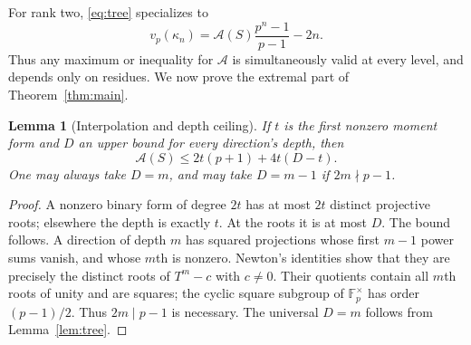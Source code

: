 \documentclass[11pt]{article}
\newtheorem{lemma}[theorem]{Lemma}
\theoremstyle{remark}\newtheorem{remark}[theorem]{Remark}
\newcommand{\F}{\mathbb F}
\newcommand{\A}{\mathcal A}
\newcommand{\vp}{v_p}
\begin{document}
For rank two, \eqref{eq:tree} specializes to
\begin{equation}\label{eq:alllevels}
 \vp(\kappa_n)=\A(S)\frac{p^n-1}{p-1}-2n.
\end{equation}
Thus any maximum or inequality for $\A$ is simultaneously valid at every level, and depends only on residues. We now prove the extremal part of Theorem~\ref{thm:main}.

\begin{lemma}[Interpolation and depth ceiling]\label{lem:upper}
If $t$ is the first nonzero moment form and $D$ an upper bound for every direction's depth, then
\[
 \A(S)\le 2t(p+1)+4t(D-t).
\]
One may always take $D=m$, and may take $D=m-1$ if $2m\nmid p-1$.
\end{lemma}
\begin{proof}
A nonzero binary form of degree $2t$ has at most $2t$ distinct projective roots; elsewhere the depth is exactly $t$. At the roots it is at most $D$. The bound follows. A direction of depth $m$ has squared projections whose first $m-1$ power sums vanish, and whose $m$th is nonzero. Newton's identities show that they are precisely the distinct roots of $T^m-c$ with $c\ne0$. Their quotients contain all $m$th roots of unity and are squares; the cyclic square subgroup of $\F_p^\times$ has order $(p-1)/2$. Thus $2m\mid p-1$ is necessary. The universal $D=m$ follows from Lemma~\ref{lem:tree}.
\end{proof}
\end{document}

